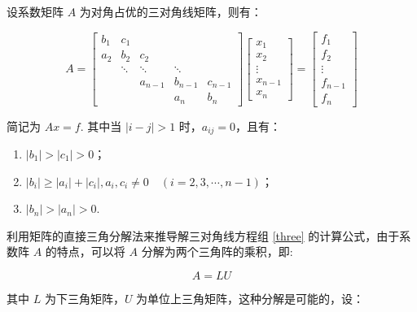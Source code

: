 设系数矩阵 $A$ 为对角占优的三对角线矩阵，则有：

\begin{equation}
    A =
    \begin{bmatrix}
        b_1 & c_1                                  \\
        a_2 & b_2    & c_2                         \\
            & \ddots & \ddots  & \ddots            \\
            &        & a_{n-1} & b_{n-1} & c_{n-1} \\
            &        &         & a_n     & b_n
    \end{bmatrix}
    \begin{bmatrix}
        x_1     \\
        x_2     \\
        \vdots  \\
        x_{n-1} \\
        x_n
    \end{bmatrix}
    =
    \begin{bmatrix}
        f_1     \\
        f_2     \\
        \vdots  \\
        f_{n-1} \\
        f_n
    \end{bmatrix}
    \label{three}
\end{equation}

简记为 \textbf{$Ax=f$}. 其中当 $\left|i-j\right| > 1$ 时，$a_{ij} = 0$，且有：

\begin{enumerate}
    \item $\left|b_1\right| > \left|c_1\right| > 0$；
    \item $\left|b_i\right| \geq \left|a_i\right| + \left|c_i\right|, a_i, c_i \neq 0\quad(i=2,3,\cdots,n-1)$；
    \item $\left|b_n\right| > \left|a_n\right| > 0$.
\end{enumerate}

利用矩阵的直接三角分解法来推导解三对角线方程组 \eqref{three} 的计算公式，由于系数阵 $A$ 的特点，可以将 $A$ 分解为两个三角阵的乘积，即:

\[A=LU\]

其中 $L$ 为下三角矩阵，$U$ 为单位上三角矩阵，这种分解是可能的，设：

